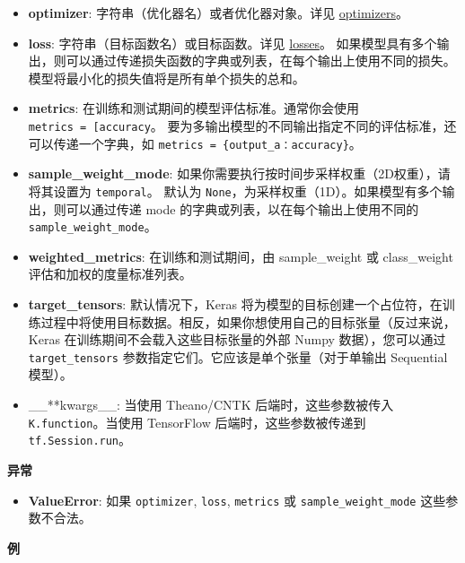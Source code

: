 \begin{itemize}
\tightlist
\item
  \textbf{optimizer}: 字符串（优化器名）或者优化器对象。详见
  \hyperref[optimizers]{optimizers}。
\item
  \textbf{loss}: 字符串（目标函数名）或目标函数。详见
  \hyperref[losses]{losses}。
  如果模型具有多个输出，则可以通过传递损失函数的字典或列表，在每个输出上使用不同的损失。模型将最小化的损失值将是所有单个损失的总和。
\item
  \textbf{metrics}: 在训练和测试期间的模型评估标准。通常你会使用
  \texttt{metrics\ =\ {[}\textquotesingle{}accuracy\textquotesingle{}{]}}。
  要为多输出模型的不同输出指定不同的评估标准，还可以传递一个字典，如
  \texttt{metrics\ =\ \{\textquotesingle{}output\_a\textquotesingle{}：\textquotesingle{}accuracy\textquotesingle{}\}}。
\item
  \textbf{sample\_weight\_mode}:
  如果你需要执行按时间步采样权重（2D权重），请将其设置为
  \texttt{temporal}。 默认为
  \texttt{None}，为采样权重（1D）。如果模型有多个输出，则可以通过传递
  mode 的字典或列表，以在每个输出上使用不同的
  \texttt{sample\_weight\_mode}。
\item
  \textbf{weighted\_metrics}: 在训练和测试期间，由 sample\_weight 或
  class\_weight 评估和加权的度量标准列表。
\item
  \textbf{target\_tensors}: 默认情况下，Keras
  将为模型的目标创建一个占位符，在训练过程中将使用目标数据。相反，如果你想使用自己的目标张量（反过来说，Keras
  在训练期间不会载入这些目标张量的外部 Numpy 数据），您可以通过
  \texttt{target\_tensors} 参数指定它们。它应该是单个张量（对于单输出
  Sequential 模型）。
\item
  \_\_**kwargs\_\_: 当使用 Theano/CNTK 后端时，这些参数被传入
  \texttt{K.function}。当使用 TensorFlow 后端时，这些参数被传递到
  \texttt{tf.Session.run}。
\end{itemize}

\textbf{异常}

\begin{itemize}
\tightlist
\item
  \textbf{ValueError}: 如果 \texttt{optimizer}, \texttt{loss},
  \texttt{metrics} 或 \texttt{sample\_weight\_mode} 这些参数不合法。
\end{itemize}

\textbf{例}

\begin{Shaded}
\begin{Highlighting}[]
\OperatorTok{=} 
\OperatorTok{=}\NormalTok{(}\NormalTok{,)))}
\OperatorTok{=}\NormalTok{))}
\OperatorTok{=}\NormalTok{,}
              \OperatorTok{=}\NormalTok{,}
              \OperatorTok{=}\NormalTok{[}\NormalTok{])}
\end{Highlighting}
\end{Shaded}



